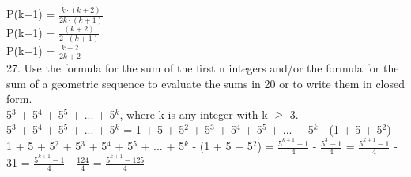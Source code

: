 \documentclass{article}
\begin{document}
P(k+1) = {\Large $\frac{k \cdot (k + 2)}{2k \cdot (k+1)}$} \\
P(k+1) = {\Large $\frac{(k + 2)}{2 \cdot (k+1)}$} \\
P(k+1) = {\Large $\frac{k + 2}{2k + 2}$} {\Large \checkmark} \\
27. Use the formula for the sum of the first n integers and/or the formula for the sum of a geometric sequence to evaluate the sums in 20 or to write them in closed form. \\
5$^3$ + 5$^4$ + 5$^5$ + ... + 5$^k$, where k is any integer with k $\geq$ 3.\\
5$^3$ + 5$^4$ + 5$^5$ + ... + 5$^k$ = 1 + 5 + 5$^2$ + 5$^3$ + 5$^4$ + 5$^5$ + ... + 5$^k$ - (1 + 5 +  5$^2$) \\
1 + 5 + 5$^2$ + 5$^3$ + 5$^4$ + 5$^5$ + ... + 5$^k$ - (1 + 5 +  5$^2$) = {\Large $\frac{5^{k+1} - 1}{4}$} - {\Large $\frac{5^{3} - 1}{4}$} = {\Large $\frac{5^{k+1} - 1}{4}$} - 31 = {\Large $\frac{5^{k+1} - 1}{4}$} - {\Large $\frac{124}{4}$} = {\Large $\frac{5^{k+1} - 125}{4}$}\\
\end{document}
